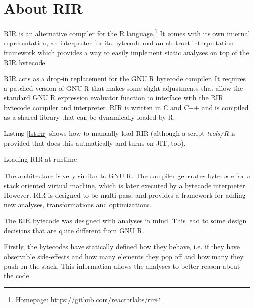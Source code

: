 \chapter{About RIR\label{rir}}

RIR is an alternative compiler for the R language.\footnote{Homepage: \url{https://github.com/reactorlabs/rir}} It comes with its own internal representation, an interpreter for its bytecode and an abstract interpretation framework which provides a way to easily implement static analyses on top of the RIR bytecode.

RIR acts as a drop-in replacement for the GNU R bytecode compiler. It requires a patched version of GNU R that makes some slight adjustments that allow the standard GNU R expression evaluator function to interface with the RIR bytecode compiler and interpreter. RIR is written in C and C++ and is compiled as a shared library that can be dynamically loaded by R.

Listing \ref{lst:rir} shows how to manually load RIR (although a script \emph{tools/R} is provided that does this autmatically and turns on JIT, too).

\begin{listing}[htbp]
  \caption{\label{lst:rir}Loading RIR at runtime}
  \begin{rcode}
> dyn.load("~/rir/build/librir.so")  # path to the shared object
> source("~/rir/rir/R/rir.R")  # load the API for RIR compiler
> # RIR is now ready:
> f <- rir.compile(function() {})
> f
function() {}
<bytecode: 0x34b4510>
> rir.disassemble(f)
0x2f80538
   guard_fun_  { == 0x2077cd8
   push_  23 # NULL
   ret_ 
  \end{rcode}
\end{listing}

The architecture is very similar to GNU R. The compiler generates bytecode for a stack oriented virtual machine, which is later executed by a bytecode interpreter. However, RIR is designed to be multi pass, and provides a framework for adding new analyses, transformations and optimizations.

The RIR bytecode was designed with analyses in mind. This lead to some design decisions that are quite different from GNU R.

Firstly, the bytecodes have statically defined how they behave, i.e. if they have observable side-effects and how many elements they pop off and how many they push on the stack. This information allows the analyses to better reason about the code.

